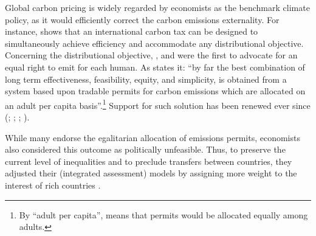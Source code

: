 Global carbon pricing is widely regarded by economists as the benchmark climate policy, as it would efficiently correct the carbon emissions externality. For instance,  shows that an international carbon tax can be designed to simultaneously achieve efficiency and accommodate any distributional objective. 
Concerning the distributional objective, ,  and  were the first to advocate for an equal right to emit for each human. As  states it: ``by far the best combination of long term effectiveness, feasibility, equity, and simplicity, is obtained from a system based upon tradable permits for carbon emissions which are allocated on an adult per capita basis''.\footnote{By ``adult per capita'',  means that permits would be allocated equally among adults.} Support for such solution has been renewed ever since (; ; ; ). %

While many endorse the egalitarian allocation of emissions permits, economists also considered this outcome as politically unfeasible. Thus, to preserve the current level of inequalities and to preclude transfers between countries, they adjusted their (integrated assessment) models by assigning more weight to the interest of rich countries .  %

